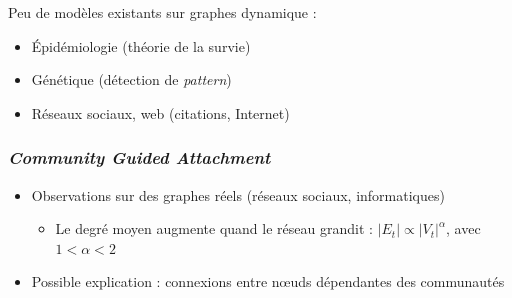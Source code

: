 \documentclass[c]{beamer}
\begin{document}
\begin{frame}
\begin{columns}
\begin{column}{.5\textwidth}
{\begin{figure}
                \end{figure}
            }
        \end{column}
    \end{columns}
\end{frame}

\begin{frame}
        Peu de modèles existants sur graphes dynamique :
        \begin{itemize}
            \item Épidémiologie (théorie de la survie)
            \item Génétique (détection de \emph{pattern})
            \item Réseaux sociaux, web (citations, Internet)
        \end{itemize}
\end{frame}

\begin{frame}
    \frametitle{\emph{Community Guided Attachment}}

    \begin{itemize}
        \item Observations sur des graphes réels (réseaux sociaux, informatiques)
        \begin{itemize}
            \item Le degré moyen augmente quand le réseau grandit : $|E_t|
                \propto |V_t|^{\alpha}$, avec $1 < \alpha < 2$
        \end{itemize}
        \item Possible explication : connexions entre n\oe{}uds dépendantes
            des communautés
    \end{itemize}
\end{frame}
\end{document}
